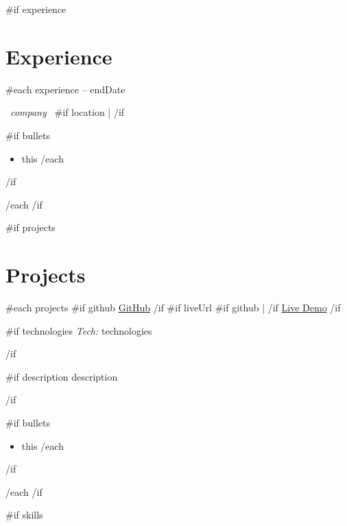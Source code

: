 \documentclass[10pt,a4paper]{article}
\begin{document}
{{#if experience}}
\section{Experience}

{{#each experience}}
\textbf{ }
\hfill
{\small{} -- {{endDate}} }
\par

{\small\textit{ {{~company~}} }
{{#if location}}
\enspace | 
{{/if}}
}
\par

{{#if bullets}}
\begin{itemize}
    {{#each bullets}}
    \item {{this}}
    {{/each}}
\end{itemize}
{{/if}}

\vspace{2pt}
{{/each}}
{{/if}}

{{#if projects}}
\section{Projects}

{{#each projects}}
\textbf{ }
\hfill
{\small
{{#if github}}
\href{ {{~github~}} }{GitHub}
{{/if}}
{{#if liveUrl}}
{{#if github}}
\enspace | \enspace
{{/if}}
\href{ {{~liveUrl~}} }{Live Demo}
{{/if}}
}
\par

{{#if technologies}}
{\small\color{muted}
\textit{Tech:} {{technologies}}
}
\par
{{/if}}

{{#if description}}
{{description}}
\par
{{/if}}

{{#if bullets}}
\begin{itemize}
    {{#each bullets}}
    \item {{this}}
    {{/each}}
\end{itemize}
{{/if}}

\vspace{2pt}
{{/each}}
{{/if}}

{{#if skills}}
\end{document}
